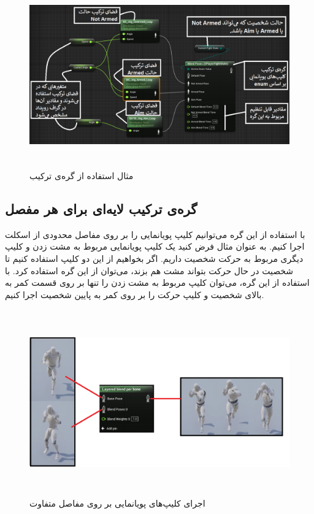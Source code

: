 \begin{figure}[ht]
	\centerline{\includegraphics[width=\textwidth,height=8cm,keepaspectratio]{Figures/Ch3/EnumBlendNode_WithArrow.png}}\hfill
	\caption{ مثال استفاده از گره‌ی ترکیب }
	\label{fig:EnumBlendNode_WithArrow}
\end{figure}

\subsection{ گره‌ی ترکیب لایه‌ای برای هر مفصل}

با استفاده از این گره‌ می‌توانیم کلیپ‌ پویانمایی را بر روی 
مفاصل محدودی از اسکلت اجرا کنیم.
به عنوان مثال فرض کنید یک کلیپ پویانمایی مربوط به مشت زدن و کلیپ 
دیگری مربوط به حرکت شخصیت داریم. 
اگر بخواهیم از این دو کلیپ استفاده کنیم تا شخصیت در حال 
حرکت بتواند مشت هم بزند، می‌توان از این گره استفاده کرد.
با استفاده از این گره، می‌توان کلیپ مربوط به مشت زدن را تنها 
بر روی قسمت کمر به بالا‌‌‌ی شخصیت و کلیپ حرکت را بر 
روی کمر به پایین شخصیت اجرا کنیم.

\begin{figure}[ht]
	\centerline{\includegraphics[width=\textwidth,height=8cm,keepaspectratio]{Figures/Ch3/LayeredBlendPerBone_WithArrow.png}}\hfill
	\caption{ اجرای کلیپ‌‌‌های پویانمایی بر روی مفاصل متفاوت }
	\label{fig:LayeredBlendPerBone_WithArrow}
\end{figure}

